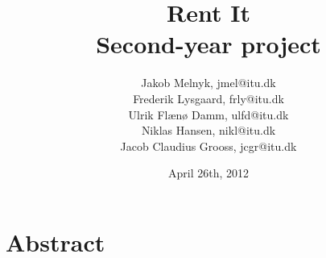 \documentclass{report}
\title{\huge{Rent It}\\
\large{Second-year project}
}
\author{
Jakob Melnyk, jmel@itu.dk\\
Frederik Lysgaard, frly@itu.dk\\
Ulrik Flænø Damm, ulfd@itu.dk\\
Niklas Hansen, nikl@itu.dk\\
Jacob Claudius Grooss, jcgr@itu.dk
}
\date{April 26th, 2012}
\begin{document}
\maketitle
\vfill
\section*{Abstract}

\clearpage
\tableofcontents
\pagebreak

\begin{thebibliography}{9}
\bibitem{}
\end{thebibliography}
\end{document}
